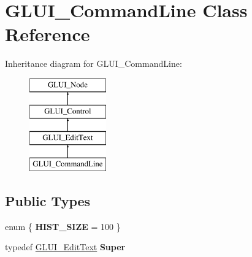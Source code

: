 \hypertarget{classGLUI__CommandLine}{\section{G\-L\-U\-I\-\_\-\-Command\-Line Class Reference}
\label{classGLUI__CommandLine}
}
Inheritance diagram for G\-L\-U\-I\-\_\-\-Command\-Line\-:\begin{figure}[H]
\begin{center}
\leavevmode
\includegraphics[height=4.000000cm]{classGLUI__CommandLine}
\end{center}
\end{figure}
\subsection*{Public Types}
\begin{DoxyCompactItemize}
\item 
enum \{ {\bfseries H\-I\-S\-T\-\_\-\-S\-I\-Z\-E} = 100
 \}
\item 
\hypertarget{classGLUI__CommandLine_af9db00326863efa876cbb5c6b2d255b7}{typedef \hyperlink{classGLUI__EditText}{G\-L\-U\-I\-\_\-\-Edit\-Text} {\bfseries Super}}\label{classGLUI__CommandLine_af9db00326863efa876cbb5c6b2d255b7}

\end{DoxyCompactItemize}
